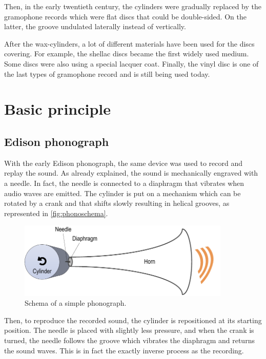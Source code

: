 Then, in the early twentieth century, the cylinders were gradually replaced by the gramophone records which were flat discs that could be double-sided. On the latter, the groove undulated laterally instead of vertically.

After the wax-cylinders, a lot of different materials have been used for the discs covering. For example, the shellac discs became the first widely used medium. Some discs were also using a special lacquer coat. Finally, the vinyl disc is one of the last types of gramophone record and is still being used today.

\section{Basic principle}

\subsection{Edison phonograph}

With the early Edison phonograph, the same device was used to record and replay the sound. As already explained, the sound is mechanically engraved with a needle. In fact, the needle is connected to a diaphragm that vibrates when audio waves are emitted. The cylinder is put on a mechanism which can be rotated by a crank and that shifts slowly resulting in helical grooves, as represented in \autoref{fig:phonoschema}.

\begin{figure}[!ht]
\centering
\includegraphics[width=0.9\textwidth]{images/phono-schema}
\caption{Schema of a simple phonograph.}
\label{fig:phonoschema}
\end{figure}

Then, to reproduce the recorded sound, the cylinder is repositioned at its starting position. The needle is placed with slightly less pressure, and when the crank is turned, the needle follows the groove which vibrates the diaphragm and returns the sound waves. This is in fact the exactly inverse process as the recording.

